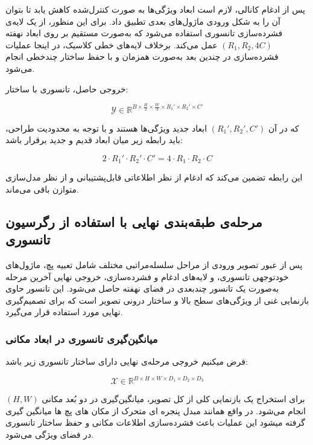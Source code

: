 پس از ادغام کانالی، لازم است ابعاد ویژگی‌ها به صورت کنترل‌شده کاهش یابد تا بتوان آن را به شکل ورودی ماژول‌های بعدی تطبیق داد. برای این منظور، از یک لایه‌ی فشرده‌سازی تانسوری استفاده می‌شود که به‌صورت مستقیم بر روی ابعاد نهفته $(R_1, R_2, 4C)$ عمل می‌کند. برخلاف لایه‌های خطی کلاسیک، در اینجا عملیات فشرده‌سازی در چندین بعد به‌صورت همزمان و با حفظ ساختار چندخطی انجام می‌شود.

خروجی حاصل، تانسوری با ساختار:

\[
\mathcal{Y} \in \mathbb{R}^{B \times \frac{H}{2} \times \frac{W}{2} \times R_1' \times R_2' \times C'}
\]

که در آن $(R_1', R_2', C')$ ابعاد جدید ویژگی‌ها هستند و با توجه به محدودیت طراحی، باید رابطه زیر میان ابعاد قدیم و جدید برقرار باشد:



\begin{equation}
	2 \cdot R_1' \cdot R_2' \cdot C' = 4 \cdot R_1 \cdot R_2 \cdot C
\end{equation}

این رابطه تضمین می‌کند که ادغام از نظر اطلاعاتی قابل‌پشتیبانی و از نظر مدل‌سازی متوازن باقی می‌ماند.



\subsection{مرحله‌ی طبقه‌بندی نهایی با استفاده از رگرسیون تانسوری}

پس از عبور تصویر ورودی از مراحل سلسله‌مراتبی مختلف شامل تعبیه پچ، ماژول‌های خودتوجهی تانسوری، و لایه‌های ادغام و فشرده‌سازی، خروجی نهایی آخرین مرحله به‌صورت یک تانسور چندبعدی در فضای نهفته حاصل می‌شود. این تانسور حاوی بازنمایی غنی از ویژگی‌های سطح بالا و ساختار درونی تصویر است که برای تصمیم‌گیری نهایی مورد استفاده قرار می‌گیرد.

\subsubsection*{میانگین‌گیری تانسوری در ابعاد مکانی}

فرض میکنیم خروجی مرحله‌ی نهایی دارای ساختار تانسوری زیر باشد:

\[
\mathcal{X} \in \mathbb{R}^{B \times H \times W \times D_1 \times D_2 \times D_3}
\]


برای استخراج یک بازنمایی کلی از کل تصویر، میانگین‌گیری در دو بُعد مکانی $(H, W)$ انجام می‌شود. 
در واقع همانند مبدل پنجره ای متحرک از مکان های پچ ها میانگین گیری گرفته میشود 
این عملیات باعث فشرده‌سازی اطلاعات مکانی و حفظ ساختار تانسوری در فضای ویژگی می‌شود.

